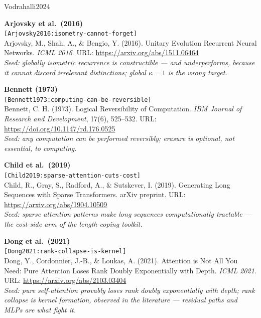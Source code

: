 \documentclass[11pt]{article}
\theoremstyle{remark}
\begin{document}
\begin{thebibliography}{Vodrahalli2024}
\setlength{\itemsep}{7pt}

\textbf{Arjovsky et al.\ (2016)}\\
{\small\texttt{[Arjovsky2016:isometry-cannot-forget]}}\\
Arjovsky, M., Shah, A., \& Bengio, Y. (2016). Unitary Evolution Recurrent
Neural Networks. \emph{ICML 2016}. URL: \url{https://arxiv.org/abs/1511.06464}\\
\emph{Seed: globally isometric recurrence is constructible --- and
underperforms, because it cannot discard irrelevant distinctions; global
$\kappa=1$ is the wrong target.}

\textbf{Bennett (1973)}\\
{\small\texttt{[Bennett1973:computing-can-be-reversible]}}\\
Bennett, C. H. (1973). Logical Reversibility of Computation. \emph{IBM Journal
of Research and Development}, 17(6), 525--532.
URL: \url{https://doi.org/10.1147/rd.176.0525}\\
\emph{Seed: any computation can be performed reversibly; erasure is optional,
not essential, to computing.}

\textbf{Child et al.\ (2019)}\\
{\small\texttt{[Child2019:sparse-attention-cuts-cost]}}\\
Child, R., Gray, S., Radford, A., \& Sutskever, I. (2019). Generating Long
Sequences with Sparse Transformers. arXiv preprint.
URL: \url{https://arxiv.org/abs/1904.10509}\\
\emph{Seed: sparse attention patterns make long sequences computationally
tractable --- the cost-side arm of the length-coping toolkit.}

\textbf{Dong et al.\ (2021)}\\
{\small\texttt{[Dong2021:rank-collapse-is-kernel]}}\\
Dong, Y., Cordonnier, J.-B., \& Loukas, A. (2021). Attention is Not All You
Need: Pure Attention Loses Rank Doubly Exponentially with Depth.
\emph{ICML 2021}. URL: \url{https://arxiv.org/abs/2103.03404}\\
\emph{Seed: pure self-attention provably loses rank doubly exponentially with
depth; rank collapse is kernel formation, observed in the literature ---
residual paths and MLPs are what fight it.}


\end{thebibliography}
\end{document}
